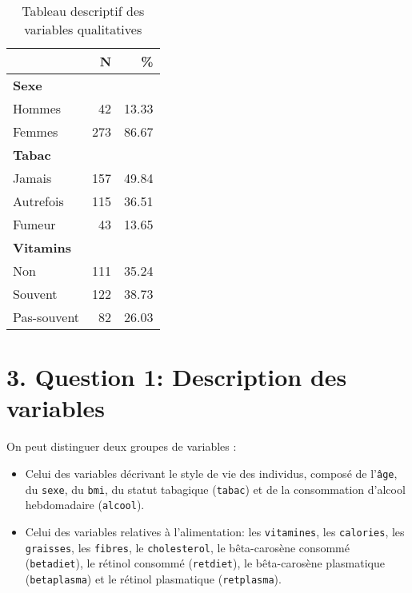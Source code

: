 \documentclass[]{article}
\providecommand{\tightlist}{%
  \setlength{\itemsep}{0pt}\setlength{\parskip}{0pt}}
\begin{document}
\begin{table}

\caption{\label{tab:unnamed-chunk-6}Tableau descriptif des variables qualitatives}
\centering
\begin{tabular}[t]{l|r|r}
\hline
  & N & \%\\
\hline
\multicolumn{3}{l}{\textbf{Sexe}}\\
\hline
\rowcolor[HTML]{BBD2E1}  \hspace{1em}Hommes & 42 & 13.33\\
\hline
\hspace{1em}Femmes & 273 & 86.67\\
\hline
\multicolumn{3}{l}{\textbf{Tabac}}\\
\hline
\rowcolor[HTML]{BBD2E1}  \hspace{1em}Jamais & 157 & 49.84\\
\hline
\hspace{1em}Autrefois & 115 & 36.51\\
\hline
\rowcolor[HTML]{BBD2E1}  \hspace{1em}Fumeur & 43 & 13.65\\
\hline
\multicolumn{3}{l}{\textbf{Vitamins}}\\
\hline
\hspace{1em}Non & 111 & 35.24\\
\hline
\rowcolor[HTML]{BBD2E1}  \hspace{1em}Souvent & 122 & 38.73\\
\hline
\hspace{1em}Pas-souvent & 82 & 26.03\\
\hline
\end{tabular}
\end{table}

\section{3. Question 1: Description des
variables}\label{question-1-description-des-variables}

On peut distinguer deux groupes de variables :

\begin{itemize}
\tightlist
\item
  Celui des variables décrivant le style de vie des individus, composé
  de l'\texttt{âge}, du \texttt{sexe}, du \texttt{bmi}, du statut
  tabagique (\texttt{tabac}) et de la consommation d'alcool hebdomadaire
  (\texttt{alcool}).
\item
  Celui des variables relatives à l'alimentation: les
  \texttt{vitamines}, les \texttt{calories}, les \texttt{graisses}, les
  \texttt{fibres}, le \texttt{cholesterol}, le bêta-carosène consommé
  (\texttt{betadiet}), le rétinol consommé (\texttt{retdiet}), le
  bêta-carosène plasmatique (\texttt{betaplasma}) et le rétinol
  plasmatique (\texttt{retplasma}).
\end{itemize}
\end{document}
